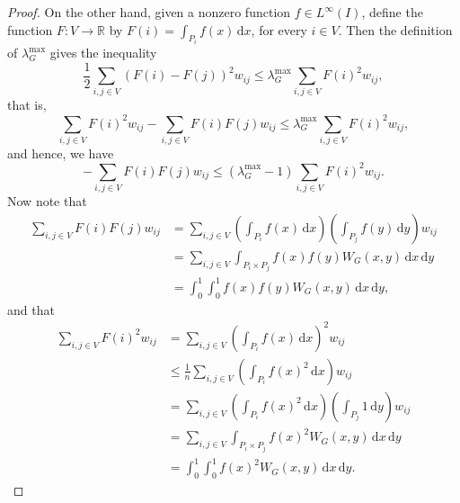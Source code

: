 \documentclass[12pt,a4paper,bold]{thesis}
\theoremstyle{definition}
\newcommand*{\map}[3]{#1 \colon #2 \to #3}
\begin{document}
\begin{proof}
    On the other hand, given a nonzero function $f \in L^{\infty}(I)$, define 
    the function $\map{F}{V}{\mathbb{R}}$ by $F(i) = \int_{P_i} f(x)\, \mathrm{d}x$,
    for every $i \in V$.
    Then the definition of $\lambda_G^{\max}$ gives the inequality
    \begin{equation*}
        \frac{1}{2} \sum_{i,j \in V} (F(i) - F(j))^2 w_{ij} 
        \leq \lambda_G^{\max} \sum_{i,j \in V} F(i)^2 w_{ij},
    \end{equation*}
    that is,
    \begin{equation*}
        \sum_{i,j \in V} F(i)^2 w_{ij} - \sum_{i,j \in V} F(i) F(j) w_{ij}
        \leq \lambda_G^{\max} \sum_{i,j \in V} F(i)^2 w_{ij},
    \end{equation*}
    and hence, we have
    \begin{equation} \label{ineq:largestEVforG}
        - \sum_{i,j \in V} F(i) F(j) w_{ij} 
        \leq (\lambda_G^{\max} - 1) \sum_{i,j \in V} F(i)^2 w_{ij}.
    \end{equation}
    Now note that
    \begin{align*}
        \sum_{i,j \in V} F(i) F(j) w_{ij} 
        & =
        \sum_{i,j \in V} \left(\int_{P_i} f(x)\, \mathrm{d}x\right) 
        \left(\int_{P_j} f(y)\, \mathrm{d}y\right) w_{ij}
        \\
        & =
        \sum_{i,j \in V} \int_{P_i \times P_j} f(x) f(y) W_G(x,y)\, \mathrm{d}x\, \mathrm{d}y
        \\
        & =
        \int_{0}^{1} \int_{0}^{1} f(x) f(y) W_G(x,y)\, \mathrm{d}x\, \mathrm{d}y,
    \end{align*}
    and that
    \begin{align*}
        \sum_{i,j \in V} F(i)^2 w_{ij}
        & =
        \sum_{i,j \in V} \left(\int_{P_i} f(x)\, \mathrm{d}x\right)^2 w_{ij}
        \\
        & \leq
        \frac{1}{n} \sum_{i,j \in V} \left(\int_{P_i} f(x)^2\, \mathrm{d}x\right) w_{ij}
        \tag{using the Cauchy--Schwarz inequality}
        \\
        & =
        \sum_{i,j \in V} \left(\int_{P_i} f(x)^2\, \mathrm{d}x\right) 
        \left(\int_{P_j} 1\, \mathrm{d}y\right) w_{ij}
        \\
        & =
        \sum_{i,j \in V} \int_{P_i \times P_j} f(x)^2 W_G(x,y)\, \mathrm{d}x\, \mathrm{d}y
        \\
        & =
        \int_{0}^{1} \int_{0}^{1} f(x)^2 W_G(x,y)\, \mathrm{d}x\, \mathrm{d}y.
    \end{align*}

\end{proof}
\end{document}
